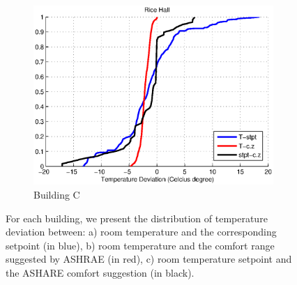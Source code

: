 \begin{figure}[h]
\begin{subfigure}{0.32\textwidth}
		\includegraphics[width=\textwidth]{./figs/Rice_new.eps}
                \caption{Building C}
	\end{subfigure}
\caption{For each building, we present the distribution of temperature deviation between: a) room temperature and the corresponding setpoint (in blue), b) room temperature and the comfort range suggested by ASHRAE (in red), c) room temperature setpoint and the ASHARE comfort suggestion (in black).}
\label{fig:cdf_temp}
\end{figure}

